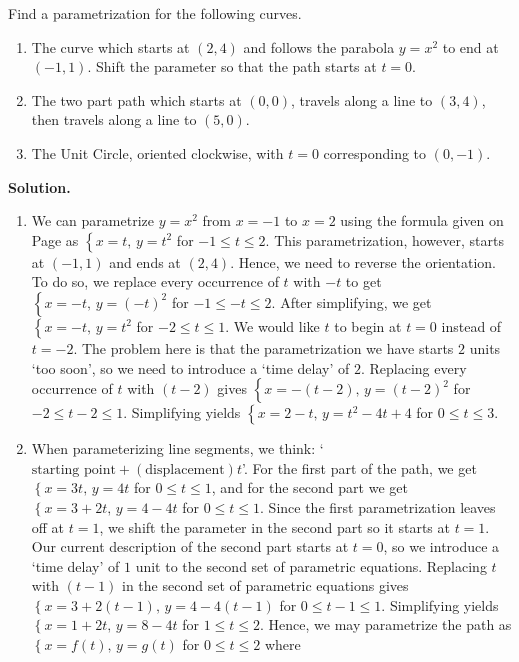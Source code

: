 \begin{ex} \label{adjustparametricex}  Find a parametrization for the following curves.

\begin{enumerate}

\item The curve which starts at $(2,4)$ and follows the parabola $y = x^2$ to end at $(-1,1)$.  Shift the parameter so that the path starts at $t=0$.

\item The two part path which starts at $(0,0)$, travels along a line to $(3,4)$, then travels along a line to $(5,0)$. 

\item  \label{adjustcircleex} The Unit Circle, oriented clockwise, with $t=0$ corresponding to $(0,-1)$.


\end{enumerate}

{\bf Solution.}  $~$

\begin{enumerate}

\item  We can parametrize $y = x^2$ from $x=-1$ to $x=2$ using the formula given on Page \pageref{commonparametrizations} as $\left\{x = t, \, y = t^2 \right.$ for $-1 \leq t \leq 2$.  This parametrization, however, starts at $(-1,1)$ and ends at $(2,4)$.  Hence, we need to reverse the orientation.  To do so, we replace every occurrence of $t$ with $-t$ to get $\left\{x = -t, \, y = (-t)^2 \right.$ for $-1 \leq -t \leq 2$.  After simplifying, we get  $\left\{x = -t, \, y = t^2 \right.$ for $-2 \leq t \leq 1$.  We would like $t$ to begin at $t=0$ instead of $t=-2$. The problem here is that the parametrization we have  starts $2$ units `too soon', so we need to introduce a `time delay' of $2$.  Replacing every occurrence of $t$ with $(t-2)$ gives $\left\{x = -(t-2), \, y =(t-2) ^2 \right.$ for  $-2 \leq t -2 \leq 1$.  Simplifying yields $\left\{x = 2-t, \, y =t^2-4t+4\right.$ for $0 \leq t  \leq 3$.

\item  When parameterizing line segments, we think: `$\text{starting point} + (\text{displacement})t$'. For the first part of the path, we get $\left\{ x = 3t, \, y = 4t \right.$ for $0 \leq t \leq 1$, and for the second part we get $\left\{ x = 3 + 2t, \, y = 4 - 4t \right.$ for $0 \leq t \leq 1$.  Since the first parametrization leaves off at $t=1$, we shift the parameter in the second part so it starts at $t=1$.  Our current description of the second part starts at $t=0$, so we introduce a `time delay' of $1$ unit to the second set of parametric equations.  Replacing $t$ with $(t-1)$ in the second set of parametric equations gives $\left\{ x = 3 + 2(t-1), \, y = 4 - 4(t-1) \right.$ for $0 \leq t-1 \leq 1$.   Simplifying yields $\left\{ x = 1+2t, \, y = 8  -4t \right.$ for $1 \leq t \leq 2$. Hence, we may parametrize the path as $\left\{ x = f(t), \, y = g(t) \right.$ for $0 \leq t \leq 2$ where


\end{enumerate}
\end{ex}
